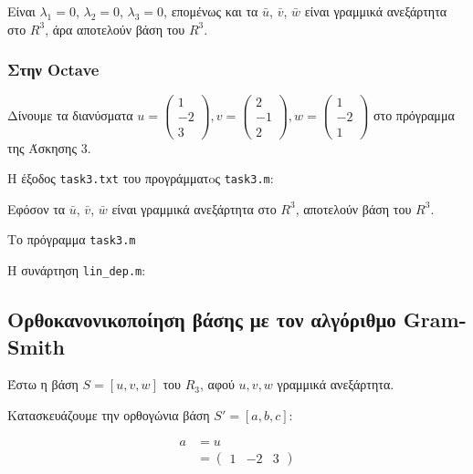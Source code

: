 \documentclass[12pt, fleqn, leqno]{extreport}
\begin{document}
Είναι $\lambda_{1}=0$, $\lambda_{2}=0$, $\lambda_{3}=0$, επομένως και τα $\bar{u}$, $\bar{v}$, $\bar{w}$ είναι γραμμικά ανεξάρτητα στο $R^{3}$, άρα αποτελούν βάση του $R^{3}$.

\newpage
\subsubsection{Στην Octave}

Δίνουμε τα διανύσματα
$
    u = \begin{pmatrix}
        1 \\ -2 \\ 3
    \end{pmatrix},
    v = \begin{pmatrix}
        2 \\ -1 \\ 2
    \end{pmatrix},
    w = \begin{pmatrix}
        1 \\ -2 \\ 1
    \end{pmatrix}
$
στο πρόγραμμα της Άσκησης 3.

Η έξοδος  \lstinline[language={}]{task3.txt} του προγράμματoς  \lstinline[language={}]{task3.m}:


Εφόσον τα $\bar{u}$, $\bar{v}$, $\bar{w}$ είναι γραμμικά ανεξάρτητα στο $R^{3}$, αποτελούν βάση του $R^{3}$.

Το πρόγραμμα \lstinline[language={}]{task3.m}


Η συνάρτηση \lstinline[language={}]{lin_dep.m}:



\newpage
\subsection{Ορθοκανονικοποίηση βάσης με τον αλγόριθμο Gram-Smith}

Έστω η βάση $S=[u, v, w]$ του $R_{3}$, αφού $u, v, w$ γραμμικά ανεξάρτητα.

Κατασκευάζουμε την ορθογώνια βάση $S'=[a, b, c]$:

\begin{equation}
    \begin{split}
        a &= u
        \\&=
        \begin{pmatrix}
            1 & -2 & 3
        \end{pmatrix}
    \end{split}
\end{equation}
\end{document}
